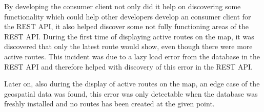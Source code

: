 \bigskip
By developing the consumer client not only did it help on discovering some functionality which could help other developers develop an consumer client for the REST API, it also helped discover some not fully functioning areas of the REST API.
During the first time of displaying active routes on the map, it was discovered that only the latest route would show, even though there were more active routes.
This incident was due to a lazy load error from the database in the REST API and therefore helped with discovery of this error in the REST API.

Later on, also during the display of active routes on the map, an edge case of the geospatial data was found, this error was only detectable when the database was freshly installed and no routes has been created at the given point.
